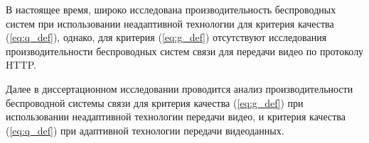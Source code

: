 В настоящее время, широко исследована производительность беспроводных систем при использовании неадаптивной технологии для критерия качества (\ref{eq:q_def}), однако, для критерия (\ref{eq:g_def}) отсутствуют исследования производительности беспроводных систем связи для передачи видео по протоколу HTTP.

Далее в диссертационном исследовании проводится анализ производительности беспроводной системы связи для критерия качества (\ref{eq:g_def}) при использовании неадаптивной технологии передачи видео, и критерия качества (\ref{eq:q_def}) при адаптивной технологии передачи видеоданных.






